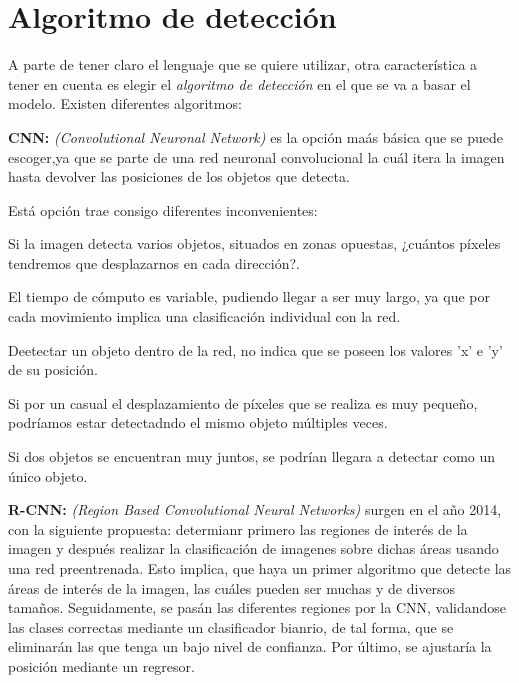 \section{Algoritmo de detección}
A parte de tener claro el lenguaje que se quiere utilizar, otra característica a tener en cuenta es elegir el \textit{algoritmo de detección} en el que se va a basar el modelo.
Existen diferentes algoritmos:
\begin{list}{\textbullet}{ %
    \addtolength{\itemsep}{-2mm} %
    \setlength{\itemindent}{2mm}}

    \item \textbf{CNN:} \textit{(Convolutional Neuronal Network)} es la opción maás básica que se puede escoger,ya que se parte de una red neuronal convolucional \cite{cnn} la cuál itera la imagen hasta devolver las posiciones de los objetos que detecta.
    
    Está opción trae consigo diferentes inconvenientes:
    \begin{list}{\textbullet}{ %
        \addtolength{\itemsep}{-2mm} %
        \setlength{\itemindent}{2mm}}
        \item Si la imagen detecta varios objetos, situados en zonas opuestas, ¿cuántos píxeles tendremos que desplazarnos en cada dirección?.
        \item El tiempo de cómputo es variable, pudiendo llegar a ser muy largo, ya que por cada movimiento implica una clasificación individual con la red.
        \item Deetectar un objeto dentro de la red, no indica que se poseen los valores 'x' e 'y' de su posición.
        \item Si por un casual el desplazamiento de píxeles que se realiza es muy pequeño, podríamos estar detectadndo el mismo objeto múltiples veces.
        \item Si dos objetos se encuentran muy juntos, se podrían llegara a detectar como un único objeto.    
    \end{list}
    \item \textbf{R-CNN:} \textit{(Region Based Convolutional Neural Networks)} surgen en el año 2014, con la siguiente propuesta: determianr primero las regiones de interés de la imagen y después realizar la clasificación de imagenes sobre dichas áreas usando una red preentrenada.\cite{r-cnn}
    Esto implica, que haya un primer algoritmo que detecte las áreas de interés de la imagen, las cuáles pueden ser muchas y de diversos tamaños. Seguidamente, se pasán las diferentes regiones por la CNN, validandose las clases correctas mediante un clasificador bianrio, de tal forma, que se eliminarán
    las que tenga un bajo nivel de confianza. Por último, se ajustaría la posición mediante un regresor.
    

\end{list}
